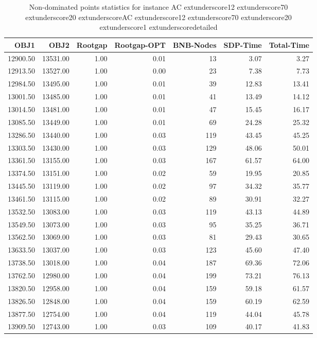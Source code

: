\begin{table}
\caption{Non-dominated points statistics for instance AC	extunderscore12	extunderscore70	extunderscore20	extunderscoreAC	extunderscore12	extunderscore70	extunderscore20	extunderscore1	extunderscoredetailed}
\label{tab:stats/AC_12_70_20_AC_12_70_20_1_detailed}
\begin{tabular}{rrrrrrr}
\toprule
OBJ1 & OBJ2 & Rootgap & Rootgap-OPT & BNB-Nodes & SDP-Time & Total-Time \\
\midrule
12900.50 & 13531.00 & 1.00 & 0.01 & 13 & 3.07 & 3.27 \\
12913.50 & 13527.00 & 1.00 & 0.00 & 23 & 7.38 & 7.73 \\
12984.50 & 13495.00 & 1.00 & 0.01 & 39 & 12.83 & 13.41 \\
13001.50 & 13485.00 & 1.00 & 0.01 & 41 & 13.49 & 14.12 \\
13014.50 & 13481.00 & 1.00 & 0.01 & 47 & 15.45 & 16.17 \\
13085.50 & 13449.00 & 1.00 & 0.01 & 69 & 24.28 & 25.32 \\
13286.50 & 13440.00 & 1.00 & 0.03 & 119 & 43.45 & 45.25 \\
13303.50 & 13430.00 & 1.00 & 0.03 & 129 & 48.06 & 50.01 \\
13361.50 & 13155.00 & 1.00 & 0.03 & 167 & 61.57 & 64.00 \\
13374.50 & 13151.00 & 1.00 & 0.02 & 59 & 19.95 & 20.85 \\
13445.50 & 13119.00 & 1.00 & 0.02 & 97 & 34.32 & 35.77 \\
13461.50 & 13115.00 & 1.00 & 0.02 & 89 & 30.91 & 32.27 \\
13532.50 & 13083.00 & 1.00 & 0.03 & 119 & 43.13 & 44.89 \\
13549.50 & 13073.00 & 1.00 & 0.03 & 95 & 35.25 & 36.71 \\
13562.50 & 13069.00 & 1.00 & 0.03 & 81 & 29.43 & 30.65 \\
13633.50 & 13037.00 & 1.00 & 0.03 & 123 & 45.60 & 47.40 \\
13738.50 & 13018.00 & 1.00 & 0.04 & 187 & 69.36 & 72.06 \\
13762.50 & 12980.00 & 1.00 & 0.04 & 199 & 73.21 & 76.13 \\
13820.50 & 12958.00 & 1.00 & 0.04 & 159 & 59.18 & 61.57 \\
13826.50 & 12848.00 & 1.00 & 0.04 & 159 & 60.19 & 62.59 \\
13877.50 & 12754.00 & 1.00 & 0.04 & 119 & 44.04 & 45.78 \\
13909.50 & 12743.00 & 1.00 & 0.03 & 109 & 40.17 & 41.83 \\

\end{tabular}
\end{table}
